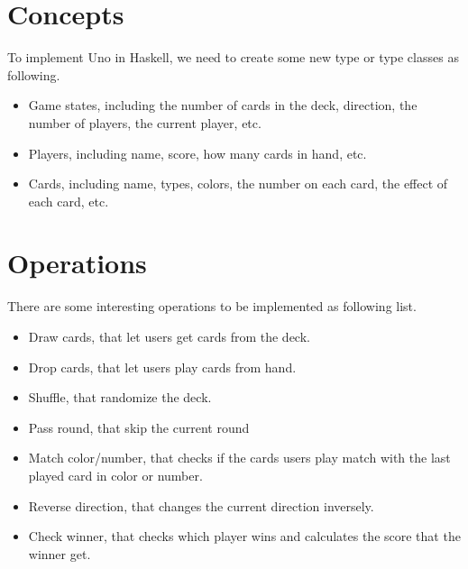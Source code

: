 \documentclass[letterpaper,12pt,fleqn]{article}
\begin{document}
\section*{Concepts}
To implement Uno in Haskell, we need to create some new type or type classes as following.
\begin{itemize}
\setlength{\itemsep}{0em}
	\item Game states, including the number of cards in the deck, direction, the number of players, the current player, etc.
	\item Players, including name, score, how many cards in hand, etc.
	\item Cards, including name, types, colors, the number on each card, the effect of each card, etc.
\end{itemize}


\section*{Operations}
There are some interesting operations to be implemented as following list.
\begin{itemize}
\setlength{\itemsep}{0em}
	\item Draw cards, that let users get cards from the deck.
	\item Drop cards, that let users play cards from hand.
	\item Shuffle, that randomize the deck.
	\item Pass round, that skip the current round
	\item Match color/number, that checks if the cards users play match with the last played card in color or number.
	\item Reverse direction, that changes the current direction inversely.
	\item Check winner, that checks which player wins and calculates the score that the winner get.
\end{itemize}
\end{document}
